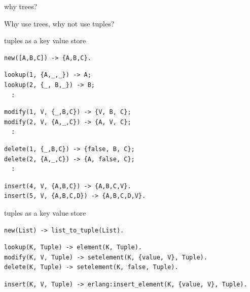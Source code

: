\begin{frame}{why trees?}

\pause \vspace{40pt}
Why use trees, why not use tuples?

\end{frame}

\begin{frame}[fragile]{tuples as a key value store}

\begin{verbatim}
new([A,B,C]) -> {A,B,C}.
\end{verbatim}
\pause
\begin{verbatim}
lookup(1, {A,_,_}) -> A;
lookup(2, {_, B,_}) -> B;
  :
\end{verbatim}
\pause
\begin{verbatim}
modify(1, V, {_,B,C}) -> {V, B, C};
modify(2, V, {A,_,C}) -> {A, V, C};
  :
\end{verbatim}
\pause
\begin{verbatim}
delete(1, {_,B,C}) -> {false, B, C};
delete(2, {A,_,C}) -> {A, false, C};
  :
\end{verbatim}
\pause
\begin{verbatim}
insert(4, V, {A,B,C}) -> {A,B,C,V}.
insert(5, V, {A,B,C,D}) -> {A,B,C,D,V}.
\end{verbatim}


\end{frame}

\begin{frame}[fragile]{tuples as a key value store}

\begin{verbatim}
new(List) -> list_to_tuple(List).
\end{verbatim}
\pause
\begin{verbatim}
lookup(K, Tuple) -> element(K, Tuple).
modify(K, V, Tuple) -> setelement(K, {value, V}, Tuple).
delete(K, Tuple) -> setelement(K, false, Tuple).
\end{verbatim}
\pause
\begin{verbatim}
insert(K, V, Tuple) -> erlang:insert_element(K, {value, V}, Tuple).
\end{verbatim}


\end{frame}


